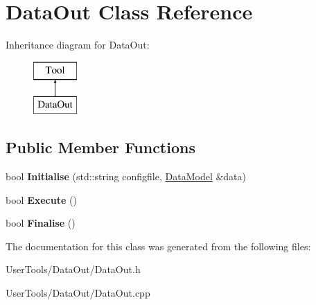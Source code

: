 \hypertarget{classDataOut}{\section{Data\-Out Class Reference}
\label{classDataOut}
}
Inheritance diagram for Data\-Out\-:\begin{figure}[H]
\begin{center}
\leavevmode
\includegraphics[height=2.000000cm]{classDataOut}
\end{center}
\end{figure}
\subsection*{Public Member Functions}
\begin{DoxyCompactItemize}
\item 
\hypertarget{classDataOut_ac79897fa3139ecccae928a1ae714841b}{bool {\bfseries Initialise} (std\-::string configfile, \hyperlink{classDataModel}{Data\-Model} \&data)}\label{classDataOut_ac79897fa3139ecccae928a1ae714841b}

\item 
\hypertarget{classDataOut_a9bcfadc03f76dde733dbf7a8aa1ed345}{bool {\bfseries Execute} ()}\label{classDataOut_a9bcfadc03f76dde733dbf7a8aa1ed345}

\item 
\hypertarget{classDataOut_a147ccd7146788b72a12f83f25fe3e487}{bool {\bfseries Finalise} ()}\label{classDataOut_a147ccd7146788b72a12f83f25fe3e487}

\end{DoxyCompactItemize}


The documentation for this class was generated from the following files\-:\begin{DoxyCompactItemize}
\item 
User\-Tools/\-Data\-Out/Data\-Out.\-h\item 
User\-Tools/\-Data\-Out/Data\-Out.\-cpp\end{DoxyCompactItemize}
